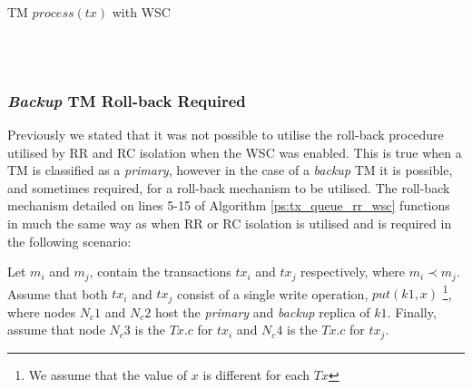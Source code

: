     \begin{algorithm}
        \caption{TM $process(tx)$ with WSC}
        \label{ps:transaction_manager_process_tx}
        \begin{algorithmic}[1]
                \ELSE
	            \ENDIF
            \ENDIF
            \\
	                \ELSE
		                \ENDIF
	                \ENDIF
	            \ENDWHILE
	            \ENDIF
	        \ENDIF
	        \\
        \end{algorithmic}
    \end{algorithm}
    
        \subsubsection*{\emph{Backup} TM Roll-back Required}
        Previously we stated that it was not possible to utilise the roll-back procedure utilised by RR and RC isolation when the WSC was enabled.  This is true when a TM is classified as a \emph{primary}, however in the case of a \emph{backup} TM it is possible, and sometimes required, for a roll-back mechanism to be utilised.  The roll-back mechanism detailed on lines 5-15 of Algorithm \ref{ps:tx_queue_rr_wsc} functions in much the same way as when RR or RC isolation is utilised and is required in the following scenario:
        
        Let $m_i$ and $m_j$, contain the transactions $tx_i$ and $tx_j$ respectively, where $m_i \prec m_j$.  Assume that both $tx_i$ and $tx_j$ consist of a single write operation, $put(k1,x)$ \footnote{We assume that the value of $x$ is different for each $Tx$}, where nodes $N_c1$ and $N_c2$ host the \emph{primary} and \emph{backup} replica of $k1$.  Finally, assume that node $N_c3$ is the $Tx.c$ for $tx_i$ and $N_c4$ is the $Tx.c$ for $tx_j$. 
        
